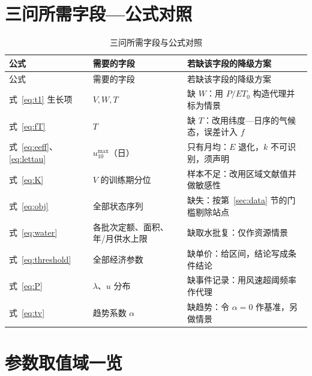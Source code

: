 \documentclass[11pt,a4paper]{ctexart}
\begin{document}
\section{三问所需字段—公式对照}\label{app:field}

\begin{longtable}{|p{3.7cm}|p{4.7cm}|p{6.0cm}|}
\caption{三问所需字段与公式对照}\label{tab:fieldmap}\\
\hline
公式 & 需要的字段 & 若缺该字段的降级方案 \\
\hline
\endfirsthead
\hline
公式 & 需要的字段 & 若缺该字段的降级方案 \\
\hline
\endhead
式~\eqref{eq:t1} 生长项 & $V,W,T$ & 缺 $W$：用 $P/ET_0$ 构造代理并标为情景 \\
式~\eqref{eq:fT} & $T$ & 缺 $T$：改用纬度—日序的气候态，误差计入 $f$ \\
式~\eqref{eq:eeff}、\eqref{eq:lettau} & $u_{10}^{\max}$（日） & 只有月均：$E$ 退化，$k$ 不可识别，须声明 \\
式~\eqref{eq:K} & $V$ 的训练期分位 & 样本不足：改用区域文献值并做敏感性 \\
式~\eqref{eq:obj} & 全部状态序列 & 缺失：按第~\ref{sec:data} 节的门槛剔除站点 \\
式~\eqref{eq:water} & 各批次定额、面积、年/月供水上限 & 缺取水批复：仅作资源情景 \\
式~\eqref{eq:threshold} & 全部经济参数 & 缺单价：给区间，结论写成条件结论 \\
式~\eqref{eq:P} & $\lambda$、$u$ 分布 & 缺事件记录：用风速超阈频率作代理 \\
式~\eqref{eq:tv} & 趋势系数 $\alpha$ & 缺趋势：令 $\alpha=0$ 作基准，另做情景 \\
\hline
\end{longtable}

\section{参数取值域一览}\label{app:par}
\end{document}
